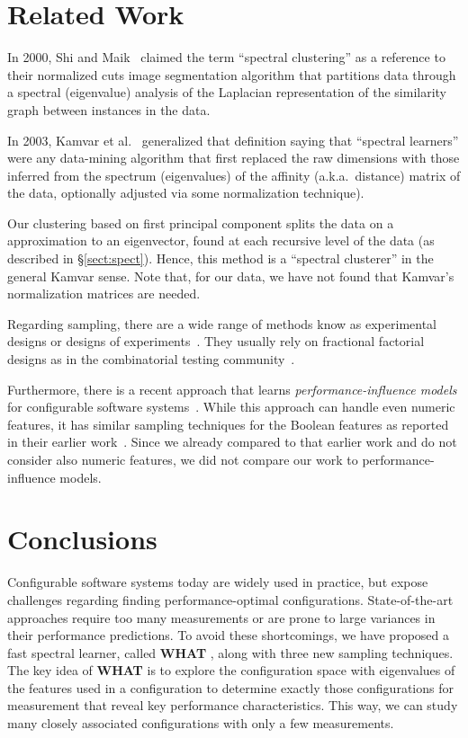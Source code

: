 \documentclass{newsig}
\newcommand{\tion}[1]{\S\ref{sect:#1}}
\newcommand{\what}{{\bf WHAT }}
\begin{document}
\section{Related Work}
\label{sect:related}
 
In 2000, Shi and Maik~\cite{shi00} claimed the term ``spectral clustering'' as a reference to their normalized cuts
image
segmentation algorithm that  partitions data through a spectral (eigenvalue) analysis of the  
Laplacian representation of the similarity graph between instances in the data.

In 2003, Kamvar et al.~\cite{kamvar2003spectral}  generalized that definition saying that ``spectral learners''
were any data-mining algorithm that first replaced the raw
dimensions with those inferred from the spectrum (eigenvalues) of the affinity (a.k.a.\ distance)
matrix of the data, optionally adjusted via some normalization technique).

Our clustering based on first principal component splits the data on a   approximation to an eigenvector, found at each recursive level
of the data (as described in \tion{spect}). 
Hence, this  method is a ``spectral clusterer'' in the general Kamvar sense. 
Note that,
for our data, we have
not found that Kamvar's normalization matrices are needed.

Regarding sampling, there are a wide range of methods know as experimental designs or designs of experiments~\cite{pukelsheim2006optimal}. They usually rely on fractional factorial designs as in the combinatorial testing community~\cite{Kuhn:2013}. 

Furthermore, there is a recent approach that learns {\em per\-for\-mance-influence models} for configurable software systems~\cite{SGA+15}. While this approach can handle even numeric features, it has similar sampling techniques for the Boolean features as reported in their earlier work~\cite{siegmund2012predicting}. Since we already compared to that earlier work and do not consider also numeric features, we did not compare our work to performance-influence models.
 



\section{Conclusions}

Configurable software systems today are widely used in practice, but expose challenges regarding finding performance-optimal configurations. State-of-the-art approaches require too many measurements or are prone to large variances in their performance predictions. To avoid these shortcomings, we have proposed a fast spectral learner, called \what,  along with three new sampling techniques. The key idea of \what is to explore the configuration space with eigenvalues of the features used in a configuration to determine exactly those configurations for measurement that reveal key performance characteristics. 
This way, we can study many closely associated configurations with only a few measurements.
\end{document}
